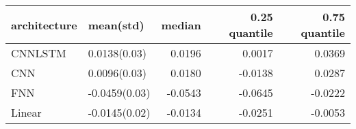 \begin{tabular}{llrrr}
\toprule
architecture &     mean(std) &  median &  0.25 quantile &  0.75 quantile \\
\midrule
     CNNLSTM &  0.0138(0.03) &  0.0196 &         0.0017 &         0.0369 \\
         CNN &  0.0096(0.03) &  0.0180 &        -0.0138 &         0.0287 \\
         FNN & -0.0459(0.03) & -0.0543 &        -0.0645 &        -0.0222 \\
      Linear & -0.0145(0.02) & -0.0134 &        -0.0251 &        -0.0053 \\
\bottomrule
\end{tabular}
